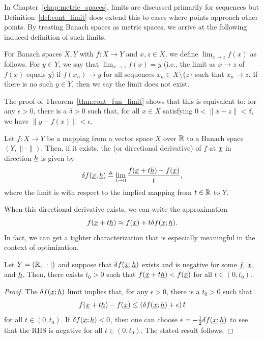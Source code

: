 In Chapter~\ref{chap:metric_spaces}, limits are discussed primarily for sequences but Definition~\ref{def:cont_limit} does extend this to cases where points approach other points.
By treating Banach spaces as metric spaces, we arrive at the following induced definition of such limits.

\begin{definition}
  For Banach spaces $X,Y$ with $f\colon X \to Y$ and $x,z \in X$, we define $\lim_{x\to z} f(x)$ as follows.
  For $y\in Y$, we say that $\lim_{x\to z} f(x) = y$ (i.e., the limit as $x \to z$ of $f(x)$ equals $y$) if $f(x_n) \to y$ for all sequences $x_n \in X \setminus \{z\}$ such that $x_n \to z$.
  If there is no such $y\in Y$, then we say the limit does not exist.
  
  The proof of Theorem~\ref{thm:cont_fun_limit} shows that this is equivalent to: for any $\epsilon> 0$, there is a $\delta >0$ such that, for all $x\in X$ satisfying $0<\|x - z\|< \delta$, we have $\| y - f(x) \| < \epsilon$.
\end{definition}

\begin{definition}
Let $f \colon X \rightarrow Y$ be a mapping from a vector space $X$ over $\mathbb{R}$ to a Banach space $(Y,\|\cdot\|)$.
Then, if it exists, the  (or directional derivative) of $f$ at $\underline{x}$ in direction $\underline{h}$ is given by
\[ \delta f (\underline{x};\underline{h}) \triangleq \lim_{t \to 0} \frac{f(\underline{x}+t \underline{h}) - f(\underline{x})}{t}, \]
where the limit is with respect to the implied mapping from $t\in \mathbb{R}$ to $Y$.
\end{definition}


When this directional derivative exists, we can write the approximation
\begin{equation*}
f(\underline{x} + t \underline{h}) \approx f(\underline{x}) + t \delta f (\underline{x}; \underline{h}) .
\end{equation*}
In fact, we can get a tighter characterization that is especially meaningful in the context of optimization.

\begin{lemma}
\label{lemma:gateaux_negative}
Let $Y = (\mathbb{R},|\cdot|)$ and suppose that $\delta f (\underline{x};\underline{h})$ exists and is negative for some $f$, $\underline{x}$, and $\underline{h}$.  Then, there exists $t_0 > 0$ such that $f(\underline{x}+t \underline{h}) < f (\underline{x})$ for all $t\in(0,t_0)$.
\end{lemma}
\begin{proof}
The $\delta f (\underline{x};\underline{h})$ limit implies that, for any $\epsilon > 0$, there is a $t_0 > 0$ such that
\[ f(\underline{x}+t \underline{h}) - f (\underline{x}) \leq \left( \delta f (\underline{x};\underline{h}) + \epsilon \right)t \]
for all $t\in (0,t_0)$.
If $\delta f (\underline{x};\underline{h})<0$, then one can choose $\epsilon = -\frac{1}{2}\delta f (\underline{x};\underline{h})$ to see that the RHS is negative for all $t\in (0,t_0)$.
The stated result follows.
\end{proof}

